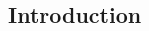 \documentclass[letterpaper,12pt]{article}
\theoremstyle{definition}
\begin{document}
\begin{spacing}{1.5}


\section{Introduction}\label{SecIntro}




\end{spacing}
\end{document}
